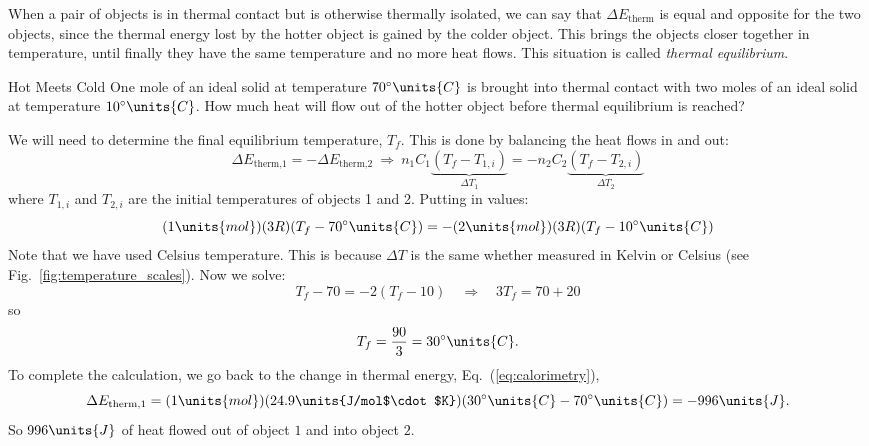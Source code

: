 When a pair of objects is in thermal contact but is otherwise thermally
isolated, we can say that $\Delta E_\text{therm}$ is equal and opposite
for the two objects, since the thermal energy lost by the hotter object
is gained by the colder object.  This brings the objects closer together
in temperature, until finally they have the same temperature and no more
heat flows.  This situation is called {\it thermal equilibrium}.

\begin{example}{Hot Meets Cold}
One mole of an ideal solid at temperature $70^\circ\units{C}$ is
brought into thermal contact with two moles of an ideal solid at
temperature $10^\circ\units{C}$.  How much heat will flow out of the
hotter object before thermal equilibrium is reached?
 
\solution 
We will need to
determine the final equilibrium temperature, $T_f$.  
This is done by balancing the heat flows in and out:
\begin{equation} 
\Delta
E_\text{therm,1} = -\Delta E_\text{therm,2} 
\>\Rightarrow\>
n_1 C_1 \underbrace{(T_f - T_{1,i})}_{\Delta T_1} = -n_2 C_2 
\underbrace{(T_f - T_{2,i}) }_{\Delta T_2}
\label{eq:calorimetry}
\end{equation}
where $T_{1,i}$ and $T_{2,i}$ are the initial temperatures of objects
1 and 2.  Putting in values:
\begin{equation}
(1\units{mol})(3R)(T_f - 70^\circ\units{C})
 = -(2\units{mol})(3R)(T_f - 10^\circ\units{C})
\end{equation}
Note that we have used Celsius temperature.  This is because $\Delta
T$ is the same whether measured in Kelvin or Celsius (see
Fig.~\ref{fig:temperature_scales}).  Now we solve:
\begin{equation}
T_f - 70 = -2(T_f-10)\quad\Rightarrow\quad 3T_f = 70+20
\end{equation}
so
\begin{equation}
T_f = \frac{90}{3} = 30^\circ\units{C}.
\end{equation}
To complete the calculation, we go back to the change in thermal energy,
Eq.~(\ref{eq:calorimetry}),
\begin{equation}
\Delta E_\text{therm,1} = (1\units{mol})(24.9\units{J/mol$\cdot$K})
(30^\circ\units{C} - 70^\circ\units{C}) = -996\units{J}.
\end{equation}
So $996\units{J}$ of heat flowed out of object $1$ and into object $2$.
\end{example}



